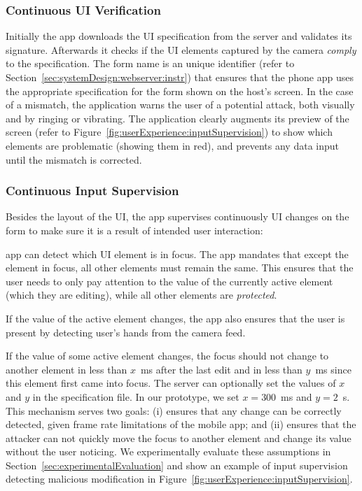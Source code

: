 \subsubsection{Continuous UI Verification}
\label{sec:systemDesign:phone:uiVerification}
Initially the app downloads the UI specification from the server and validates its signature. Afterwards it checks if the UI elements captured by the camera \textit{comply} to the specification. The form name is an unique identifier (refer to Section~\ref{sec:systemDesign:webserver:instr}) that ensures that the phone app uses the appropriate specification for the form shown on the host's screen. In the case of a mismatch, the application warns the user of a potential attack, both visually and by ringing or vibrating. The application clearly augments its preview of the screen (refer to Figure~\ref{fig:userExperience:inputSupervision}) to show which elements are problematic (showing them in red), and prevents any data input until the mismatch is corrected.

\subsubsection{Continuous Input Supervision}
\label{sec:systemDesign:phone:inputerSupervision}

Besides the layout of the UI, the app supervises continuously UI changes on the form to make sure it is a result of intended user interaction:

 \name app can detect which UI element is in focus. The app mandates that except the element in focus, all other elements must remain the same. This ensures that the user needs to only pay attention to the value of the currently active element (which they are editing), while all other elements are \emph{protected}.

 If the value of the active element changes, the app also ensures that the user is present by detecting user's hands from the camera feed.

 If the value of some active element changes, the focus should not change to another element in less than $x$~ms after the last edit and in less than $y$~ms since this element first came into focus. The server can optionally set the values of $x$ and $y$ in the specification file. In our prototype, we set $x=300$~ms and $y=2$~s. This mechanism serves two goals: (i) ensures that any change can be correctly detected, given frame rate limitations of the mobile app; and (ii) ensures that the attacker can not quickly move the focus to another element and change its value without the user noticing. We experimentally evaluate these assumptions in Section~\ref{sec:experimentalEvaluation} and show an example of input supervision detecting malicious modification in Figure~\ref{fig:userExperience:inputSupervision}.

